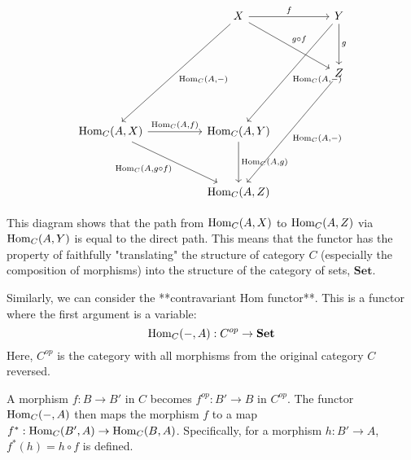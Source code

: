 \documentclass[uplatex,a4j,12pt,dvipdfmx]{jsarticle}
\begin{document}
\[
	\begin{tikzcd}
		&  & X \arrow[rr, "f"] \arrow[rrdd, "g \circ f"] \arrow[lldddd, "{{\rm Hom}_{C}(A, -)}"] &  & Y \arrow[lldddd, "{{\rm Hom}_{C}(A, -)}"] \arrow[dd, "g"] \\
		&  &                                  &  &                                \\
		&  &                                  &  & Z \arrow[lldddd, "{{\rm Hom}_{C}(A, -)}"]          \\
		&  &                                  &  &                                \\
		{{\rm Hom}_{C}(A,X)} \arrow[rr, "{{\rm Hom}_{C}(A, f)}"] \arrow[rrdd, "{{\rm Hom}_{C}(A, g \circ f)}"'] &  & {{\rm Hom}_{C}(A, Y)} \arrow[dd, "{{\rm Hom}_{C}(A, g)}"]          &  &                                \\
		&  &                                  &  &                                \\
		&  & {{\rm Hom}_{C}(A, Z)}                             &  &
	\end{tikzcd}
\]

This diagram shows that the path from ${\rm Hom}_{C}(A,X)$ to ${\rm Hom}_{C}(A,Z)$ via ${\rm Hom}_{C}(A,Y)$ is equal to the direct path.
This means that the functor has the property of faithfully "translating" the structure of category $C$ (especially the composition of morphisms) into the structure of the category of sets, $\mathbf{Set}$.

Similarly, we can consider the **contravariant Hom functor**.
This is a functor where the first argument is a variable:
$$
	{\rm Hom}_{C}(-,A) : C^{op} \to \mathbf{Set}
$$
Here, $C^{op}$ is the category with all morphisms from the original category $C$ reversed.

A morphism $f : B \to B'$ in $C$ becomes $f^{op} : B' \to B$ in $C^{op}$. The functor ${\rm Hom}_{C}(-,A)$ then maps the morphism $f$ to a map
$f^* : {\rm Hom}_{C}(B',A) \to {\rm Hom}_{C}(B,A)$.
Specifically, for a morphism $h: B' \to A$,
$f^*(h) = h \circ f$
is defined.
\end{document}
